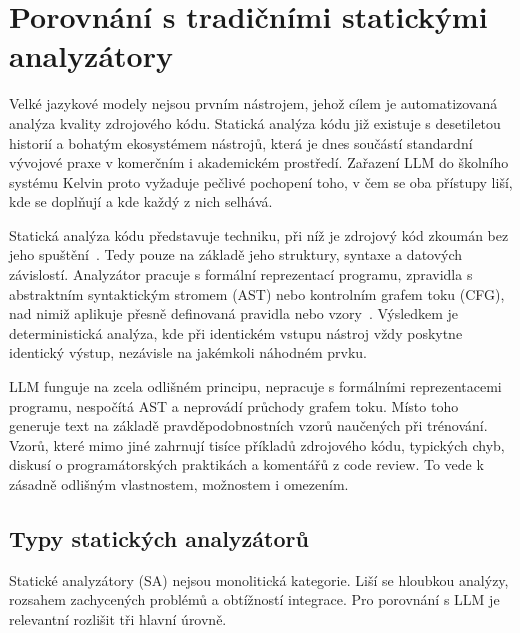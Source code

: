 \section{Porovnání s tradičními statickými analyzátory}
\label{sec:llm-vs-static}

Velké jazykové modely nejsou prvním nástrojem, jehož cílem je automatizovaná analýza kvality zdrojového kódu.
Statická analýza kódu již existuje s desetiletou historií a bohatým ekosystémem nástrojů, která je dnes součástí standardní vývojové praxe v komerčním i akademickém prostředí.
Zařazení LLM do školního systému Kelvin proto vyžaduje pečlivé pochopení toho, v čem se oba přístupy liší, kde se doplňují a kde každý z nich selhává.

Statická analýza kódu představuje techniku, při níž je zdrojový kód zkoumán bez jeho spuštění~\cite{codacy-staticanalysis}.
Tedy pouze na základě jeho struktury, syntaxe a datových závislostí.
Analyzátor pracuje s formální reprezentací programu, zpravidla s abstraktním syntaktickým stromem (AST) nebo kontrolním grafem toku (CFG), nad nimiž aplikuje přesně definovaná pravidla nebo vzory~\cite{agileseekers-staticanalysis}.
Výsledkem je deterministická analýza, kde při identickém vstupu nástroj vždy poskytne identický výstup, nezávisle na jakémkoli náhodném prvku.

LLM funguje na zcela odlišném principu, nepracuje s formálními reprezentacemi programu, nespočítá AST a neprovádí průchody grafem toku.
Místo toho generuje text na základě pravděpodobnostních vzorů naučených při trénování.
Vzorů, které mimo jiné zahrnují tisíce příkladů zdrojového kódu, typických chyb, diskusí o programátorských praktikách a komentářů z code review.
To vede k zásadně odlišným vlastnostem, možnostem i omezením.

\subsection{Typy statických analyzátorů}
\label{subsec:static-types}

Statické analyzátory (SA) nejsou monolitická kategorie.
Liší se hloubkou analýzy, rozsahem zachycených problémů a obtížností integrace.
Pro porovnání s LLM je relevantní rozlišit tři hlavní úrovně.

